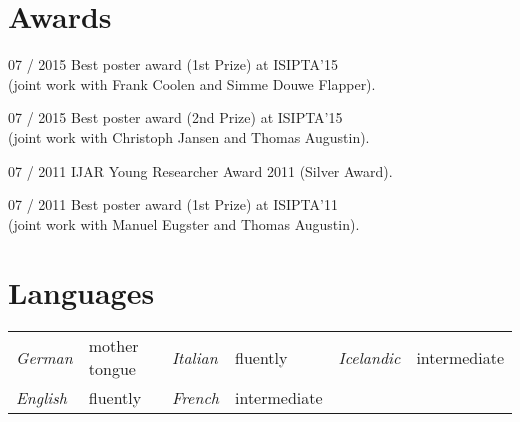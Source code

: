 \documentclass[a4paper]{simplecv}
\begin{document}
\section{Awards}
\label{awards}
\begin{topic}
\item[07 / 2015] Best poster award (1st Prize) at ISIPTA'15\\
                 (joint work with Frank Coolen and Simme Douwe Flapper).
\item[07 / 2015] Best poster award (2nd Prize) at ISIPTA'15\\
                 (joint work with Christoph Jansen and Thomas Augustin).
\item[07 / 2011] IJAR Young Researcher Award 2011 (Silver Award).
\item[07 / 2011] Best poster award (1st Prize) at ISIPTA'11\\
                 (joint work with Manuel Eugster and Thomas Augustin).
\end{topic}

\section{Languages}
\label{languages}
\begin{tabular}{llllll}%
{\sf \emph{German}}    & mother tongue \qquad\qquad &
{\sf \emph{Italian}}   & fluently \qquad\qquad\qquad &
{\sf \emph{Icelandic}} & intermediate \\
{\sf \emph{English}}   & fluently &
{\sf \emph{French}}    & intermediate &
\end{tabular}
%
\iffalse
\begin{topic}
\item[German] mother tongue
\vspace*{-1ex}
\item[English] fluently
\vspace*{-1ex}
\item[Italian] fluently
\vspace*{-1ex}
\item[French] intermediate
\vspace*{-1ex}
\item[Icelandic] basic
\end{topic}
\fi
\end{document}
